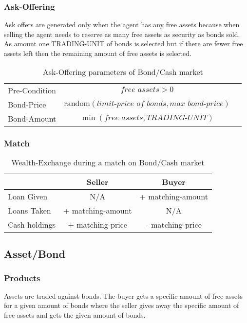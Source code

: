 \documentclass[Bachelorarbeit.tex]{subfiles}
\begin{document}
\subsubsection{Ask-Offering}
Ask offers are generated only when the agent has any free assets because when selling the agent needs to reserve as many free assets as security as bonds sold. As amount one TRADING-UNIT of bonds is selected but if there are fewer free assets left then the remaining amount of free assets is selected.

\begin{table}[H]
	\centering
	\caption{Ask-Offering parameters of Bond/Cash market}
	\begin{tabular} { l c r }
		\hline
		Pre-Condition & $\textit{free assets} > 0$  \\
		Bond-Price & $\mathrm{random}(\textit{limit-price of bonds}, \textit{max bond-price})$ \\
		Bond-Amount & $\min ({\textit{free assets} }, \textit{TRADING-UNIT} )$ \\
		\hline
	\end{tabular}
\end{table}

\subsubsection{Match}

\begin{table}[H]
	\centering
	\caption{Wealth-Exchange during a match on Bond/Cash market}
	\begin{tabular} { l c c }
		& Seller & Buyer \\
		\hline
		Loan Given & N/A & + matching-amount \\
		Loans Taken & + matching-amount & N/A \\
		Cash holdings & + matching-price & - matching-price \\
		\hline
	\end{tabular}
\end{table}

\subsection{Asset/Bond}
\subsubsection{Products}
Assets are traded against bonds. The buyer gets a specific amount of free assets for a given amount of bonds where the seller gives away the specific amount of free assets and gets the given amount of bonds.
\end{document}
